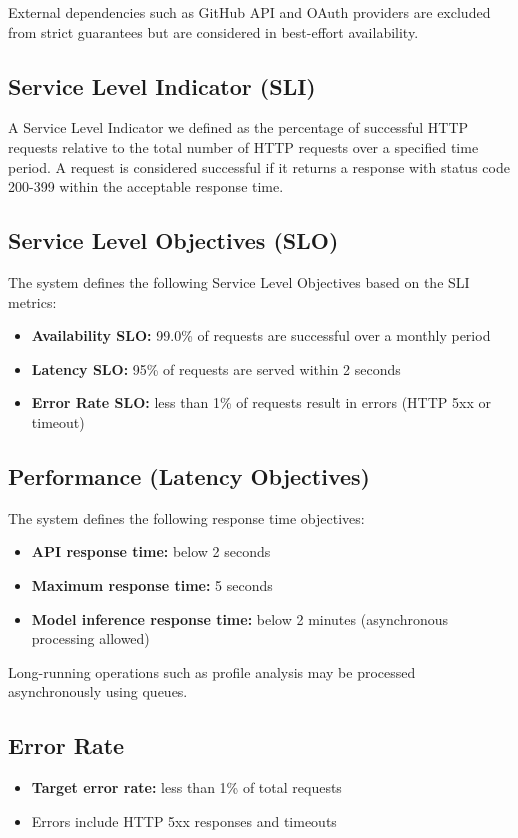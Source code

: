 \documentclass[11pt]{article}
\begin{document}
External dependencies such as GitHub API and OAuth providers are excluded from strict guarantees but are considered in best-effort availability.

\subsection{Service Level Indicator (SLI)}
A Service Level Indicator we defined as the percentage of successful HTTP requests relative to the total number of HTTP requests over a specified time period. A request is considered successful if it returns a response with status code 200-399 within the acceptable response time.

\subsection{Service Level Objectives (SLO)}

The system defines the following Service Level Objectives based on the SLI metrics:

\begin{itemize}[leftmargin=*]
  \item \textbf{Availability SLO:} 99.0\% of requests are successful over a monthly period
  \item \textbf{Latency SLO:} 95\% of requests are served within 2 seconds
  \item \textbf{Error Rate SLO:} less than 1\% of requests result in errors (HTTP 5xx or timeout)
\end{itemize}

\subsection{Performance (Latency Objectives)}
The system defines the following response time objectives:

\begin{itemize}[leftmargin=*]
  \item \textbf{API response time:} below 2 seconds
  \item \textbf{Maximum response time:} 5 seconds
  \item \textbf{Model inference response time:} below 2 minutes (asynchronous processing allowed)
\end{itemize}

Long-running operations such as profile analysis may be processed asynchronously using queues.


\subsection{Error Rate}
\begin{itemize}[leftmargin=*]
  \item \textbf{Target error rate:} less than 1\% of total requests
  \item Errors include HTTP 5xx responses and timeouts
\end{itemize}
\end{document}
